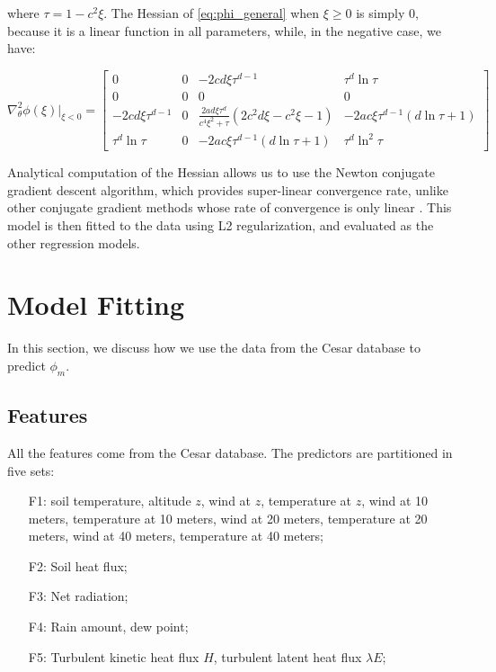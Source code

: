 \documentclass[a4paper]{book}
\begin{document}
\noindent where $\tau=1-c^2\xi$. The Hessian of \ref{eq:phi_general} when $\xi\geq 0$ is simply 0, because it is a linear function in all parameters, while, in the negative case, we have:

\begin{equation}
\nabla^2_\theta\phi(\xi)\vert_{\xi<0} = \begin{bmatrix}
0 & 0 & - 2 c d \xi \tau^{d - 1} & \tau^{d} \ln{\tau} \\
0 & 0 & 0 & 0 \\
- 2 c d \xi \tau^{d - 1} &
0 & \frac{2ad\xi\tau^{d}}{c^4\xi^2+\tau}\left(2c^2d\xi-c^2\xi-1\right) & -2ac\xi\tau^{d-1}\left(d\ln\tau+1\right) \\
\tau^d \ln\tau & 0 &
-2ac\xi\tau^{d-1}\left(d\ln\tau+1\right) &
\tau^d\ln^2\tau
\end{bmatrix}
\end{equation}

Analytical computation of the Hessian allows us to use the Newton conjugate gradient descent algorithm, which provides super-linear convergence rate, unlike other conjugate gradient methods whose rate of convergence is only linear \citep{numopt}. This model is then fitted to the data using L2 regularization, and evaluated as the other regression models.

\section{Model Fitting}
\label{sec:model_fit}
In this section, we discuss how we use the data from the Cesar database to predict $\phi_m$.

\subsection{Features}
All the features come from the Cesar database. The predictors are partitioned in five sets:

\begin{enumerate}
\item[F1:] soil temperature, altitude $z$, wind at $z$, temperature at $z$, wind at 10 meters, temperature at 10 meters, wind at 20 meters, temperature at 20 meters, wind at 40 meters, temperature at 40 meters;
\item[F2:] Soil heat flux;
\item[F3:] Net radiation;
\item[F4:] Rain amount, dew point;
\item[F5:] Turbulent kinetic heat flux $H$, turbulent latent heat flux $\lambda E$;
\end{enumerate}
\end{document}
